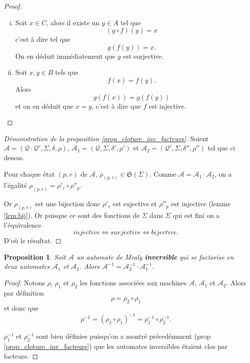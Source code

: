\documentclass[11pt,a4paper]{article}
\newtheorem{prop}{Proposition}
\begin{document}
\begin{proof}
  \begin{enumerate}[(i)]
  \item Soit $x\in C$, alors il existe un $y\in A$ tel que
    \[ (g\circ f)(y) = x \]
    c'est à dire tel que
    \[ g(f(y)) = x. \]
    On en déduit immédiatement que $g$ est surjective.

  \item Soit $x,y \in B$ tels que \[ f(x) = f(y). \] Alors \[ g(f(x)) = g(f(y)) \] et on en déduit que $x = y$, c'est à dire que $f$ est injective.
  \end{enumerate}
\end{proof}

\begin{proof}[Démonstration de la proposition \ref{prop_cloture_inv_facteurs}]
  Soient $\mathcal{A}=\left(\mathcal{Q\cdot Q'}, \Sigma, \delta, \rho\right)$, $\mathcal{A}_1=\left(\mathcal{Q}, \Sigma, \delta', \rho'\right)$ et $\mathcal{A}_2=\left(\mathcal{Q'}, \Sigma, \delta'', \rho''\right)$ tel que ci dessus.

  Pour chaque état $(p, r)$ de $\mathcal{A}$, $\rho_{(p, r)}\in \mathfrak{S}(\Sigma)$. Comme $\mathcal{A}=\mathcal{A}_1\cdot\mathcal{A}_2$, on a l'égalité $\rho_{(p, r)}=\rho'_r\circ\rho''_p$.

  Or $\rho_{(p, r)}$ est une bijection donc $\rho'_r$ est sujective et $\rho''_p$ est injective (lemme \ref{lem:bij}). Or puisque ce sont des fonctions de $\Sigma$ dans $\Sigma$ qui est fini on a l'équivalence
  \[ injective \iff surjective \iff bijective. \]
  D'où le résultat.
\end{proof}

\begin{prop}\label{prop_inverse_produit}
    Soit $\mathcal{A}$ un automate de Mealy \textbf{inversible} qui se factorise en deux automates $\mathcal{A}_1$ et $\mathcal{A}_2$.
    Alors $\mathcal{A}^{-1} = \mathcal{A}_2^{-1} \cdot \mathcal{A}_1^{-1}$.
\end{prop}

\begin{proof}
  Notons $\rho$, $\rho_1$ et $\rho_2$ les fonctions associées aux machines $\mathcal{A}$, $\mathcal{A}_1$ et $\mathcal{A}_2$. Alors par définition \[ \rho = \rho_2\circ\rho_1 \] et donc que \[ \rho^{-1} = \left(\rho_2\circ\rho_1\right)^{-1} = \rho_1^{-1}\circ\rho_2^{-1}. \]

  $\rho_1^{-1}$ et $\rho_2^{-1}$ sont bien définies puisqu'on a montré précedémment (prop \ref{prop_cloture_inv_facteurs}) que les automates inversibles étaient clos par facteurs.
\end{proof}
\end{document}
